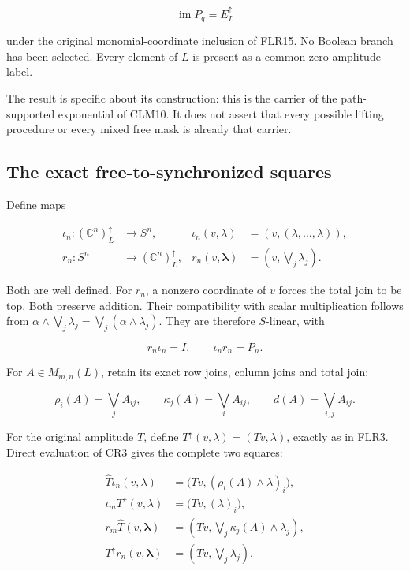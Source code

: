 \documentclass[11pt]{article}
\begin{document}
\[
\operatorname{im}P_q=E^\uparrow_L
\]

under the original monomial-coordinate inclusion of FLR15. No Boolean branch has been selected. Every element of \(L\) is present as a common zero-amplitude label.

The result is specific about its construction: this is the carrier of the path-supported exponential of CLM10. It does not assert that every possible lifting procedure or every mixed free mask is already that carrier.

\subsection{The exact free-to-synchronized squares}

Define maps

\[
\begin{aligned}
\iota_n:(\mathbb C^n)^\uparrow_L&\longrightarrow S^n,
&\iota_n(v,\lambda)&=(v,(\lambda,\ldots,\lambda)),\\
r_n:S^n&\longrightarrow(\mathbb C^n)^\uparrow_L,
&r_n(v,\boldsymbol\lambda)&=(v,\bigvee_j\lambda_j).
\end{aligned}
\tag{CR8}
\]

Both are well defined. For \(r_n\), a nonzero coordinate of \(v\) forces the total join to be top. Both preserve addition. Their compatibility with scalar multiplication follows from
\(\alpha\wedge\bigvee_j\lambda_j=\bigvee_j(\alpha\wedge\lambda_j)\).
They are therefore \(S\)-linear, with

\[
r_n\iota_n=I,\qquad \iota_nr_n=P_n.
\tag{CR9}
\]

For \(A\in M_{m,n}(L)\), retain its exact row joins, column joins and total join:

\[
\rho_i(A)=\bigvee_j A_{ij},\qquad
\kappa_j(A)=\bigvee_i A_{ij},\qquad
d(A)=\bigvee_{i,j}A_{ij}.
\tag{CR10}
\]

For the original amplitude \(T\), define \(T^\uparrow(v,\lambda)=(Tv,\lambda)\), exactly as in FLR3. Direct evaluation of CR3 gives the complete two squares:

\[
\begin{aligned}
\widehat T\iota_n(v,\lambda)
 &=\bigl(Tv,(\rho_i(A)\wedge\lambda)_i\bigr),\\
\iota_mT^\uparrow(v,\lambda)
 &=\bigl(Tv,(\lambda)_i\bigr),\\
r_m\widehat T(v,\boldsymbol\lambda)
 &=\left(Tv,\bigvee_j\kappa_j(A)\wedge\lambda_j\right),\\
T^\uparrow r_n(v,\boldsymbol\lambda)
 &=\left(Tv,\bigvee_j\lambda_j\right).
\end{aligned}
\tag{CR11}
\]
\end{document}
